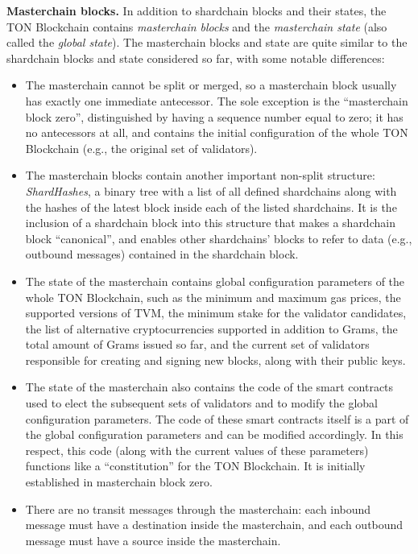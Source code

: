 \documentclass[12pt,oneside]{article}
\def\makepoint#1{\medbreak\noindent{\bf #1.\ }}
\def\nxsubpoint{\refstepcounter{subsubsection}%
  \smallbreak\makepoint{\thesubsubsection}}
\def\emb#1{\textbf{#1.}}
\begin{document}
\nxsubpoint\emb{Masterchain blocks}
In addition to shardchain blocks and their states, the TON Blockchain contains {\em masterchain blocks\/} and the {\em masterchain state\/} (also called the {\em global state}). The masterchain blocks and state are quite similar to the shardchain blocks and state considered so far, with some notable differences:
\begin{itemize}
\item The masterchain cannot be split or merged, so a masterchain block usually has exactly one immediate antecessor. The sole exception is the ``masterchain block zero'', distinguished by having a sequence number equal to zero; it has no antecessors at all, and contains the initial configuration of the whole TON Blockchain (e.g., the original set of validators).
\item The masterchain blocks contain another important non-split structure: {\em ShardHashes}, a binary tree with a list of all defined shardchains along with the hashes of the latest block inside each of the listed shardchains. It is the inclusion of a shardchain block into this structure that makes a shardchain block ``canonical'', and enables other shardchains' blocks to refer to data (e.g., outbound messages) contained in the shardchain block.
\item The state of the masterchain contains global configuration parameters of the whole TON Blockchain, such as the minimum and maximum gas prices, the supported versions of TVM, the minimum stake for the validator candidates, the list of alternative cryptocurrencies supported in addition to Grams, the total amount of Grams issued so far, and the current set of validators responsible for creating and signing new blocks, along with their public keys.
\item The state of the masterchain also contains the code of the smart contracts used to elect the subsequent sets of validators and to modify the global configuration parameters. The code of these smart contracts itself is a part of the global configuration parameters and can be modified accordingly. In this respect, this code (along with the current values of these parameters) functions like a ``constitution'' for the TON Blockchain. It is initially established in masterchain block zero.
\item There are no transit messages through the masterchain: each inbound message must have a destination inside the masterchain, and each outbound message must have a source inside the masterchain.
\end{itemize}
\end{document}
